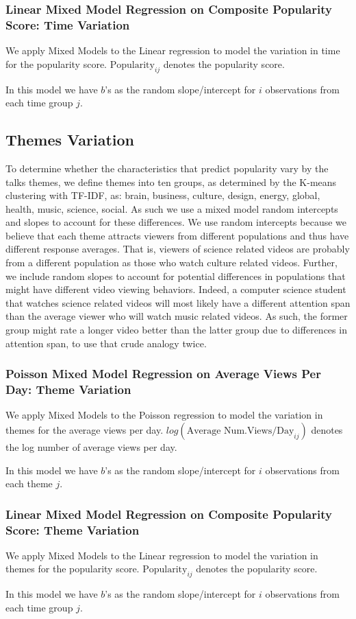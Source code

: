 \subsubsection{Linear Mixed Model Regression on Composite Popularity Score: Time Variation}
We apply Mixed Models to the Linear regression to model the variation in time for the popularity score. $\text{Popularity}_{ij}$ denotes the popularity score.

In this model we have $b$'s as the random slope/intercept for $i$ observations from each time group $j$.

\subsection{Themes Variation}
To determine whether the characteristics that predict popularity vary by the talks themes, we define themes into ten groups, as determined by the K-means clustering with TF-IDF, as: brain, business, culture, design, energy, global, health, music, science, social. As such we use a mixed model random intercepts and slopes to account for these differences.
We use random intercepts because we believe that each theme attracts viewers from different populations and thus have different response averages. That is, viewers of science related videos are probably from a different population as those who watch culture related videos. 
Further, we include random slopes to account for potential differences in populations that might have different video viewing behaviors. Indeed, a computer science student that watches science related videos will most likely have a different attention span than the average viewer who will watch music related videos. As such, the former group might rate a longer video better than the latter group due to differences in attention span, to use that crude analogy twice. 

\subsubsection{Poisson Mixed Model Regression on Average Views Per Day: Theme Variation}
We apply Mixed Models to the Poisson regression to model the variation in themes for the average views per day. $log(\text{Average Num.Views/Day}_{ij})$ denotes the log number of average views per day.

In this model we have $b$'s as the random slope/intercept for $i$ observations from each theme $j$.

\subsubsection{Linear Mixed Model Regression on Composite Popularity Score: Theme Variation}
We apply Mixed Models to the Linear regression to model the variation in themes for the popularity score. $\text{Popularity}_{ij}$ denotes the popularity score.

In this model we have $b$'s as the random slope/intercept for $i$ observations from each time group $j$.


